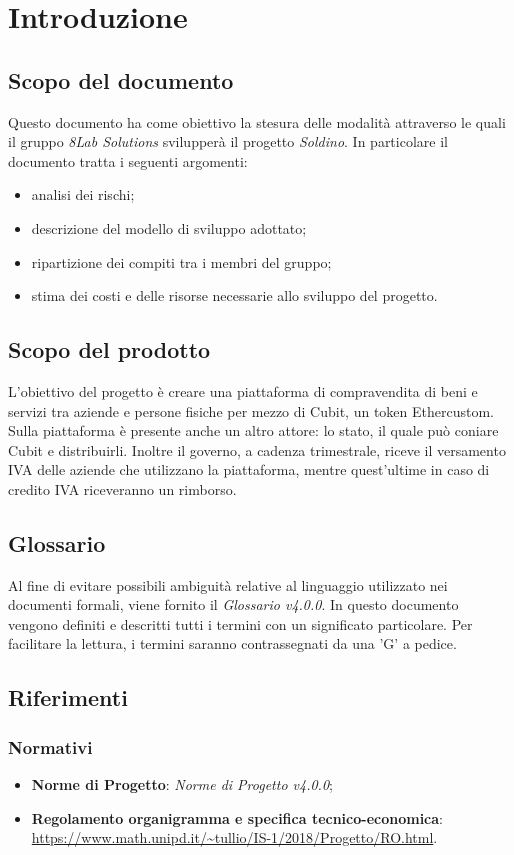 \section{Introduzione}
\subsection{Scopo del documento}
Questo documento ha come obiettivo la stesura delle modalità attraverso le quali il gruppo \textit{8Lab Solutions} svilupperà il progetto \textit{Soldino}. In particolare il documento tratta i seguenti argomenti:
\begin{itemize}
	\item analisi dei rischi;
	\item descrizione del modello di sviluppo adottato;
	\item ripartizione dei compiti tra i membri del gruppo;
	\item stima dei costi e delle risorse necessarie allo sviluppo del progetto.
\end{itemize}
\subsection{Scopo del prodotto}
L'obiettivo del progetto è creare una piattaforma di compravendita di beni e servizi tra aziende e persone fisiche per mezzo di  Cubit\glo, un token Ether\glosp custom. Sulla piattaforma è presente anche un altro attore: lo stato, il quale può coniare Cubit
 e distribuirli. Inoltre il governo, a cadenza trimestrale, riceve il versamento IVA delle aziende che utilizzano la piattaforma, mentre quest'ultime in caso di credito IVA riceveranno un rimborso.
\subsection{Glossario}
Al fine di evitare possibili ambiguità relative al linguaggio utilizzato nei documenti formali, viene fornito il \textit{Glossario v4.0.0}. In questo documento vengono definiti e descritti tutti i termini con un significato particolare. Per facilitare la lettura, i termini saranno contrassegnati da una 'G' a pedice.
\subsection{Riferimenti}
\subsubsection{Normativi}
\begin{itemize}
	\item \textbf{Norme di Progetto}: \textit{Norme di Progetto v4.0.0};
	\item \textbf{Regolamento organigramma e specifica tecnico-economica}: \\
	\url{https://www.math.unipd.it/~tullio/IS-1/2018/Progetto/RO.html}.
\end{itemize}

